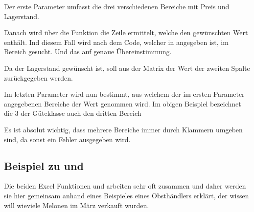 \begin{description}[labelindent=0cm, leftmargin=8cm, font=\mdseries, labelwidth=8cm,style=nextline]
\item[\stmt{(\$C\$3:\$D\$11;\$E\$3:\$F\$11;\$G\$3:\$H\$11)}]Der erste Parameter umfasst die drei verschiedenen Bereiche mit Preis und Lagerstand.
\item[\stmt{VERGLEICH(B14;\$B\$3:\$B\$11;0)}] Danach wird über die  Funktion die Zeile ermittelt, welche den gewünschten Wert enthält. Ind diesem Fall wird nach dem Code, welcher in  angegeben ist, im Bereich  gesucht. Und das auf genaue Übereinstimmung.
\item[\stmt{2}] Da der Lagerstand gewünscht ist, soll aus der Matrix der Wert der zweiten Spalte zurückgegeben werden.
\item[\stmt{\$B\$13}] Im letzten Parameter wird nun bestimmt, aus welchem der im ersten Parameter angegebenen Bereiche der Wert genommen wird. Im obigen Beispiel bezeichnet die 3 der Güteklasse auch den dritten Bereich
\end{description}
	
\begin{infobox}%
Es ist absolut wichtig, dass mehrere Bereiche immer durch Klammern \stmt{()} umgeben sind, da sonst ein Fehler ausgegeben wird.
\end{infobox}

\subsection{Beispiel zu  und }

Die beiden Excel Funktionen  und  arbeiten sehr oft zusammen und daher werden sie hier gemeinsam anhand eines Beispieles eines Obsthändlers erklärt, der wissen will wieviele Melonen im März verkauft wurden.

